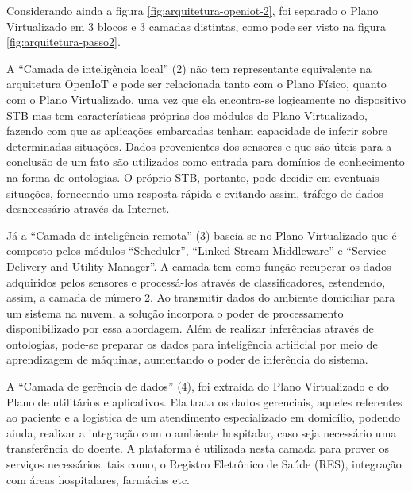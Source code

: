 
Considerando ainda a figura \ref{fig:arquitetura-openiot-2}, foi separado o Plano
Virtualizado em 3 blocos e 3 camadas distintas, como pode ser visto na figura
\ref{fig:arquitetura-passo2}. 


A ``Camada de inteligência local'' (2) não tem representante equivalente na
arquitetura OpenIoT e pode ser relacionada tanto com o Plano Físico, quanto com
o Plano Virtualizado, uma vez que ela encontra-se logicamente no dispositivo
STB mas tem características próprias dos módulos do Plano Virtualizado, 
fazendo com que as aplicações embarcadas tenham capacidade de inferir sobre
determinadas situações. Dados provenientes dos sensores e que são úteis para a
conclusão de um fato são utilizados como entrada para domínios de conhecimento
na forma de ontologias. O próprio STB, portanto, pode decidir em eventuais
situações, fornecendo uma resposta rápida e evitando assim, tráfego de dados
desnecessário através da Internet.

Já a ``Camada de inteligência remota'' (3) baseia-se no Plano Virtualizado que
é composto pelos módulos ``Scheduler'', ``Linked Stream Middleware'' e ``Service
Delivery and Utility Manager''. A camada tem como função recuperar os dados
adquiridos pelos sensores e processá-los através de classificadores,
estendendo, assim, a camada de número 2. Ao transmitir dados do ambiente
domiciliar para um sistema na nuvem, a solução incorpora o poder de
processamento disponibilizado por essa abordagem. Além de realizar inferências
através de ontologias, pode-se preparar os dados para inteligência artificial
por meio de aprendizagem de máquinas, aumentando o poder de inferência do
sistema.

A ``Camada de gerência de dados'' (4), foi extraída do Plano Virtualizado e do
Plano de utilitários e aplicativos. Ela trata os dados gerenciais, aqueles
referentes ao paciente e a logística de um atendimento especializado em
domicílio, podendo ainda, realizar a integração com o ambiente hospitalar, caso
seja necessário uma transferência do doente. A plataforma \nextsaude[]
é utilizada nesta camada para prover os serviços necessários, tais como, o 
Registro Eletrônico de Saúde (RES), integração com áreas hospitalares, farmácias etc.


